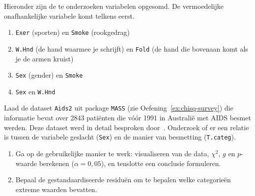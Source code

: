 \begin{exercise}
  Hieronder zijn de te onderzoeken variabelen opgesomd. De vermoedelijke onafhankelijke variabele komt telkens eerst.
  
  \begin{enumerate}
    \item \texttt{Exer} (sporten) en \texttt{Smoke} (rookgedrag)
    \item \texttt{W.Hnd} (de hand waarmee je schrijft) en \texttt{Fold} (de hand die bovenaan komt als je de armen kruist)
    \item \texttt{Sex} (gender) en \texttt{Smoke}
    \item \texttt{Sex} en \texttt{W.Hnd}
  \end{enumerate}
\end{exercise}

\begin{exercise}
  \label{ex:chisq-aids2}
  Laad de dataset \texttt{Aids2} uit package \texttt{MASS} (zie Oefening~\ref{ex:chisq-survey}) die informatie bevat over 2843 patiënten die vóór 1991 in Australië met AIDS besmet werden. Deze dataset werd in detail besproken door~\textcite{Ripley2007}. Onderzoek of er een relatie is tussen de variabele geslacht (\texttt{Sex}) en de manier van besmetting (\texttt{T.categ}).
  
  \begin{enumerate}
    \item Ga op de gebruikelijke manier te werk: visualiseren van de data, $\chi^2$, $g$ en $p$-waarde berekenen ($\alpha = 0,05$), en tenslotte een conclusie formuleren.
    \item Bepaal de gestandaardiseerde residuën om te bepalen welke categorieën extreme waarden bevatten.
  \end{enumerate}
  
\end{exercise}

